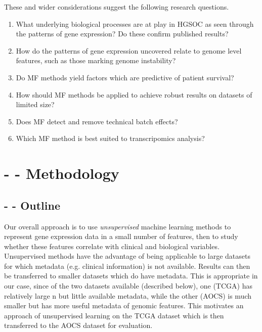 \documentclass[tikz, 11pt,a4paper,oneside,fleqn, draft]{article}
\begin{document}
These and wider considerations suggest the following research questions.

\begin{enumerate}
\item What underlying biological processes are at play in HGSOC as seen through the patterns of gene expression?  Do these confirm published results?
\item How do the patterns of gene expression uncovered relate to genome level features, such as those marking genome instability?
\item Do MF methods yield factors which are predictive of patient survival?
\item How should MF methods be applied to achieve robust results on datasets of limited size?
\item Does MF detect and remove technical batch effects?
\item Which MF method is best suited to transcripomics analysis?
\end{enumerate}



\section{- - Methodology}

\subsection{- - Outline}

Our overall approach is to use \emph{unsupervised} machine learning methods to represent gene expression data in a small number of features, then to study whether these features correlate with clinical and biological variables.  Unsupervised methods have the advantage of being applicable to large datasets for which metadata (e.g. clinical information) is not available.  Results can then be transferred to smaller datasets which do have metadata.   This is appropriate in our case, since of the two datasets available (described below), one (TCGA) has relatively large n but little available metadata, while the other (AOCS) is much smaller but has more useful metadata of genomic features.   This motivates an approach of unsupervised learning on the TCGA dataset which is then transferred to the AOCS dataset for evaluation.
\end{document}
